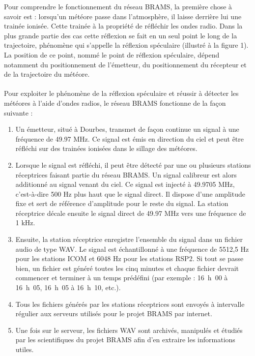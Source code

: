 \documentclass[11pt]{article}
\begin{document}
Pour comprendre le fonctionnement du réseau BRAMS, la première chose à savoir est : lorsqu'un météore passe dans l'atmosphère, il laisse derrière lui une trainée ionisée.
Cette trainée à la propriété de réfléchir les ondes radio.
Dans la plus grande partie des cas cette réflexion se fait en un seul point le long de la trajectoire, phénomène qui s'appelle la réflexion spéculaire (illustré à la figure 1).
La position de ce point, nommé le point de réflexion spéculaire, dépend notamment du positionnement de l'émetteur, du positionnement du récepteur et de la trajectoire du météore.\\
\\
Pour exploiter le phénomène de la réflexion spéculaire et réussir à détecter les météores à l'aide d'ondes radios, le réseau BRAMS fonctionne de la façon suivante :
\begin{enumerate}
    \item Un émetteur, situé à Dourbes, transmet de façon continue un signal à une fréquence de 49.97 MHz.
          Ce signal est émis en direction du ciel et peut être réfléchi sur des trainées ionisées dans le sillage des météores.
    \item Lorsque le signal est réfléchi, il peut être détecté par une ou plusieurs stations réceptrices faisant partie du réseau BRAMS.
          Un signal calibreur est alors additionné au signal venant du ciel.
          Ce signal est injecté à 49.9705 MHz, c'est-à-dire 500 Hz plus haut que le signal direct.
          Il dispose d'une amplitude fixe et sert de référence d'amplitude pour le reste du signal.
          La station réceptrice décale ensuite le signal direct de 49.97 MHz vers une fréquence de 1 kHz.
    \item Ensuite, la station réceptrice enregistre l'ensemble du signal dans un fichier audio de type WAV.
          Le signal est échantillonné à une fréquence de 5512,5 Hz pour les stations ICOM et 6048 Hz pour les stations RSP2.
          Si tout se passe bien, un fichier est généré toutes les cinq minutes et chaque fichier devrait commencer et terminer à un temps prédéfini (par exemple : 16 h 00 à 16 h 05, 16 h 05 à 16 h 10, etc.).
    \item Tous les fichiers générés par les stations réceptrices sont envoyés à intervalle régulier aux serveurs utilisés pour le projet BRAMS par internet.
    \item Une fois sur le serveur, les fichiers WAV sont archivés, manipulés et étudiés par les scientifiques du projet BRAMS afin d'en extraire les informations utiles.
\end{enumerate}
\end{document}
